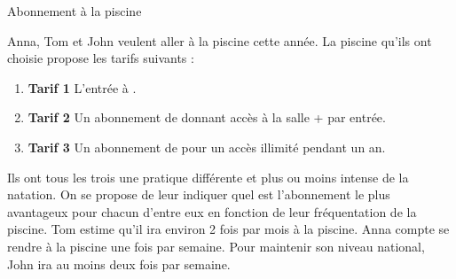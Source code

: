 \exercice Abonnement à la piscine


Anna, Tom et John veulent aller à la piscine cette année. La piscine qu'ils ont choisie propose les tarifs suivants :


\begin{enumerate}[~]
	\item \textbf{Tarif 1} L'entrée à .
	\item \textbf{Tarif 2} Un abonnement de  donnant accès à la salle +  par entrée.
	\item \textbf{Tarif 3} Un abonnement de  pour un accès illimité pendant un an.
\end{enumerate}


Ils ont tous les trois une pratique différente et plus ou moins intense de la natation. On se propose de leur indiquer quel est l'abonnement le plus avantageux pour chacun d'entre eux en fonction de leur fréquentation de la piscine. Tom estime qu'il ira environ 2 fois par mois à la piscine. Anna compte se rendre à la piscine une fois par semaine. Pour maintenir son niveau national, John ira au moins deux fois par semaine.


